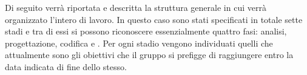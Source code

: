 Di seguito verrà riportata e descritta la struttura generale in cui verrà organizzato l'intero  di lavoro. In questo caso sono stati specificati in totale sette stadi e tra di essi si possono riconoscere essenzialmente quattro fasi: analisi, progettazione, codifica e . Per ogni stadio vengono individuati quelli che attualmente sono gli obiettivi che il gruppo \Gruppo{} si prefigge di raggiungere entro la data indicata di fine dello stesso.\\
